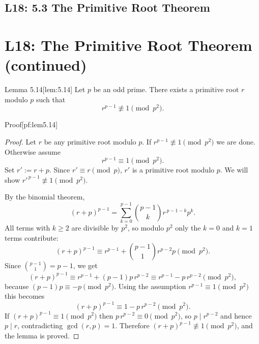 \documentclass[10pt]{article}
\theoremstyle{definition}
\theoremstyle{plain}
\numberwithin{equation}{section}
\begin{document}














\newpage
\subsection{L18: 5.3 The Primitive Root Theorem}

\section*{L18: The Primitive Root Theorem (continued)}

\begin{define}{Lemma 5.14}[lem:5.14]
Let $p$ be an odd prime. There exists a primitive root $r$ modulo $p$ such that
\[
r^{p-1}\not\equiv 1 \pmod{p^2}.
\]
\end{define}

\begin{define}{Proof}[pf:lem5.14]
\begin{proof}
Let $r$ be any primitive root modulo $p$. If $r^{p-1}\not\equiv 1\pmod{p^2}$ we are done. Otherwise assume
\[
r^{p-1}\equiv 1\pmod{p^2}.
\]
Set $r':=r+p$. Since $r'\equiv r\pmod p$, $r'$ is a primitive root modulo $p$. We will show $r'^{\,p-1}\not\equiv1\pmod{p^2}$.

By the binomial theorem,
\[
(r+p)^{p-1}=\sum_{k=0}^{p-1}\binom{p-1}{k}r^{\,p-1-k}p^k.
\]
All terms with $k\ge2$ are divisible by $p^2$, so modulo $p^2$ only the $k=0$ and $k=1$ terms contribute:
\[
(r+p)^{p-1}\equiv r^{p-1}+\binom{p-1}{1}r^{p-2}p \pmod{p^2}.
\]
Since $\binom{p-1}{1}=p-1$, we get
\[
(r+p)^{p-1}\equiv r^{p-1}+(p-1)p\,r^{p-2}\equiv r^{p-1}-p\,r^{p-2}\pmod{p^2},
\]
because $(p-1)p\equiv -p\pmod{p^2}$. Using the assumption $r^{p-1}\equiv1\pmod{p^2}$ this becomes
\[
(r+p)^{p-1}\equiv 1-p\,r^{p-2}\pmod{p^2}.
\]
If $(r+p)^{p-1}\equiv1\pmod{p^2}$ then $p\,r^{p-2}\equiv0\pmod{p^2}$, so $p\mid r^{p-2}$ and hence $p\mid r$, contradicting $\gcd(r,p)=1$. Therefore $(r+p)^{p-1}\not\equiv1\pmod{p^2}$, and the lemma is proved.
\end{proof}
\end{define}
\end{document}
